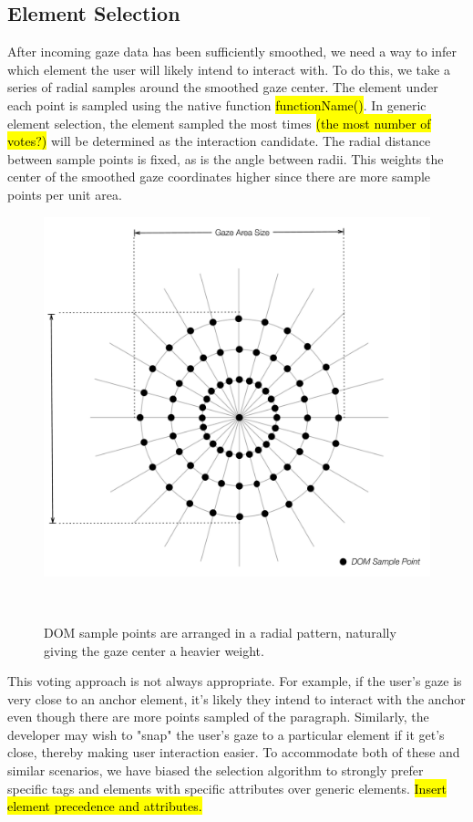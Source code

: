 \documentclass{sigchi}
\begin{document}
\subsection{Element Selection}
After incoming gaze data has been sufficiently smoothed, we need a way
to infer which element the user will likely intend to interact with. To
do this, we take a series of radial samples around the smoothed gaze
center. The element under each point is sampled using the native
function \hl{functionName()}. In generic element selection, the 
element sampled the most times \hl{(the most number of votes?)} will
be determined as the interaction candidate. The radial distance 
between sample points is fixed, as is the angle between radii. 
This weights the center of the smoothed gaze coordinates higher 
since there are more sample points per unit area.

\begin{figure}
\centering
  \includegraphics[width=0.9\columnwidth]{figures/dom-sample-points.pdf}
  \caption{DOM sample points are arranged in a radial pattern, 
  naturally giving the gaze center a heavier weight.}~\label{fig:dom-sample-points}
\end{figure}

This voting approach is not always appropriate. For example, if the
user's gaze is very close to an anchor element, it's likely they 
intend to interact with the anchor even though there are more points 
sampled of the paragraph. Similarly, the developer may wish to "snap"
the user's gaze to a particular element if it get's close, thereby 
making user interaction easier. To accommodate both of these and 
similar scenarios, we have biased the selection algorithm to strongly 
prefer specific tags and elements with specific attributes over generic
elements. \hl{Insert element precedence and attributes.}
\end{document}
